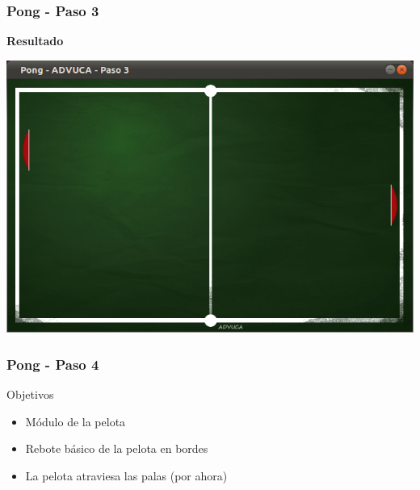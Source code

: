 \begin{frame}
	\frametitle{Pong - Paso 3}
	
    \begin{center}
        \textbf{Resultado}
    \end{center}
	
    \begin{center}
		\includegraphics[scale=0.4]{img/pong-advuca-3.png}
	\end{center}	

\end{frame}

\begin{frame}
	\frametitle{Pong - Paso 4}
	
	\begin{block}{Objetivos}
		\begin{itemize}
			\item Módulo de la pelota
			\item Rebote básico de la pelota en bordes
			\item La pelota atraviesa las palas (por ahora)
		\end{itemize}            
	\end{block}

\end{frame}

